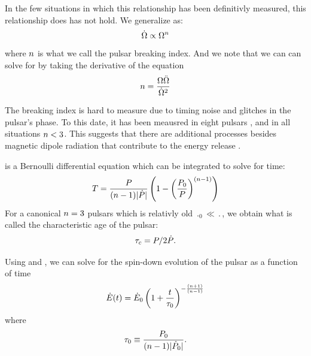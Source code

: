 In the few situations in which this relationship has been
definitivly measured, this relationship does has not hold.
We generalize  as:
\begin{equation}\eqnlabel{angular_frequency_derivative_relation}
  \angularfrequencydot \propto \angularfrequency^\breakingindex
\end{equation}
where $n$ is what we call the pulsar breaking index. 
And we note that 
we can can solve for \breakingindex by taking the derivative of the equation
\begin{equation}
  n = \frac{\Omega \ddot{\Omega}}{\dot{\Omega}^2}
\end{equation}

The breaking index is hard to measure due to timing noise and glitches
in the pulsar's phase. To this date, it has been meausred in eight 
pulsars \citep[See][ and references therein]{espinoza_2011_braking-index},
and in all situations $n<3$. This suggests 
that there are additional processes besides magnetic
dipole radiation that contribute to the energy release
\citep{blandford_1988_interpretation-pulsar}.

 is
a Bernoulli differential equation which can be integrated to solve for time:
\begin{equation}\eqnlabel{pulsar_age}
  T = \frac{\period}{(\breakingindex-1) \absval{\perioddot}}
  \left(
  1-\left(\frac{\period_0}{\period}\right)^{(\breakingindex-1)}
  \right)
\end{equation}
For a canonical $n=3$ pulsars which is
relativly old $\period_0 \ll \period$, we obtain
what is called the characteristic age of the pulsar:
\begin{equation}
  \tau_c = P/2\dot{P}.
\end{equation}

Using  and , we can solve
for the spin-down evolution of the pulsar
as a function of time
\citep{pacini_1973_evolution-supernova}
\begin{equation}\eqnlabel{energy_dot_vs_time}
    \energydot(t) = \energydot_0
    \left(
    1 + \frac{\time}{\SpinDownTimescale}
    \right)^{-\frac{(n+1)}{(n-1)}}
\end{equation}
where
\begin{equation}
  \tau_0 \equiv \frac{P_0}{(n-1)|\dot{P}_0|}.
\end{equation}


